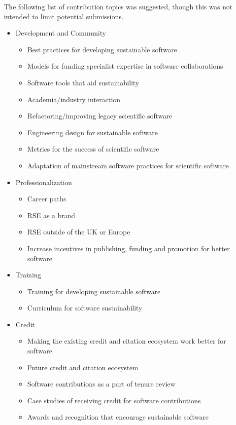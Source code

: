\documentclass[11pt, oneside]{amsart}
\begin{document}
The following list of contribution topics was suggested, though this was not intended to limit potential submissions.

%
\begin{itemize}
\renewcommand{\labelenumi}{\textbf{\theenumi}.}
\setlength{\rightmargin}{1em}

\item Development and Community
\begin{itemize}
    \item Best practices for developing sustainable software
    \item Models for funding specialist expertise in software collaborations
    \item Software tools that aid sustainability
    \item Academia/industry interaction
    \item Refactoring/improving legacy scientific software
    \item Engineering design for sustainable software
    \item Metrics for the success of scientific software
    \item Adaptation of mainstream software practices for scientific software
\end{itemize}

\item Professionalization
\begin{itemize}
    \item Career paths
    \item RSE as a brand
    \item RSE outside of the UK or Europe
    \item Increase incentives in publishing, funding and promotion for better software
\end{itemize}

\item Training
\begin{itemize}
    \item Training for developing sustainable software
    \item Curriculum for software sustainability
\end{itemize}

\item Credit
\begin{itemize}
    \item Making the existing credit and citation ecosystem work better for software
    \item Future credit and citation ecosystem
    \item Software contributions as a part of tenure review
    \item Case studies of receiving credit for software contributions
    \item Awards and recognition that encourage sustainable software
\end{itemize}


\end{itemize}
\end{document}
